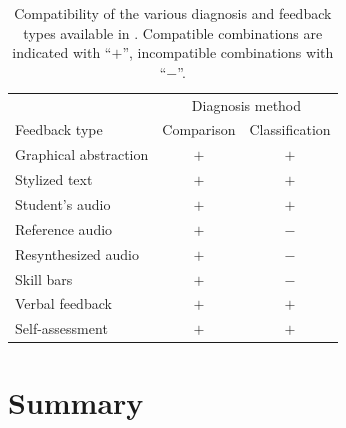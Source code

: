 	\begin{table}
		\centering
		\caption[Compatibility of available diagnosis and feedback types]{Compatibility of the various diagnosis and feedback types available in . Compatible combinations are indicated with ``$+$'', incompatible combinations with ``$-$''.}
		\begin{tabular}{lcc}
		\toprule
		& \multicolumn{2}{c}{Diagnosis method} \\
		\cmidrule(lr){2-3}
		Feedback type & Comparison & Classification \\
		\midrule
		Graphical abstraction  & $+$ & $+$ \\
		Stylized text & $+$ & $+$ \\
		Student's audio & $+$ & $+$ \\
		Reference audio & $+$ & $-$ \\
		Resynthesized audio & $+$ & $-$ \\
		Skill bars & $+$ & $-$ \\
		Verbal feedback & $+$ & $+$ \\
		Self-assessment & $+$ & $+$ \\
		\bottomrule
		\end{tabular}
		\label{tab:fb:compatibility}
	\end{table}


\section{Summary}
\label{sec:fb:summary}
\TODO{}